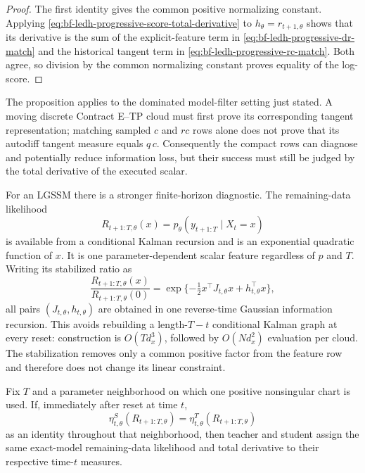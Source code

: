 \begin{proof}
The first identity gives the common positive normalizing constant.  Applying
\eqref{eq:bf-ledh-progressive-score-total-derivative} to
\(h_\theta=r_{t+1,\theta}\) shows that its derivative is the sum of the
explicit-feature term in \eqref{eq:bf-ledh-progressive-dr-match} and the
historical tangent term in \eqref{eq:bf-ledh-progressive-rc-match}.  Both agree,
so division by the common normalizing constant proves equality of the
log-score.
\end{proof}

The proposition applies to the dominated model-filter setting just stated.  A
moving discrete Contract E--TP cloud must first prove its corresponding tangent
representation; matching sampled \(c\) and \(rc\) rows alone does not prove that
its autodiff tangent measure equals \(q\,c\).  Consequently the compact rows can
diagnose and potentially reduce information loss, but their success must still
be judged by the total derivative of the executed scalar.

For an LGSSM there is a stronger finite-horizon diagnostic.  The remaining-data
likelihood
\begin{equation}
\label{eq:bf-ledh-lgssm-continuation-feature}
  R_{t+1:T,\theta}(x)
  =p_\theta(y_{t+1:T}\mid X_t=x)
\end{equation}
is available from a conditional Kalman recursion and is an exponential
quadratic function of \(x\).  It is one parameter-dependent scalar feature
regardless of \(p\) and \(T\).
Writing its stabilized ratio as
\[
 \frac{R_{t+1:T,\theta}(x)}{R_{t+1:T,\theta}(0)}
 =\exp\{-\tfrac12x^\top J_{t,\theta}x+h_{t,\theta}^\top x\},
\]
all pairs \((J_{t,\theta},h_{t,\theta})\) are obtained in one reverse-time
Gaussian information recursion.  This avoids rebuilding a length-\(T-t\)
conditional Kalman graph at every reset: construction is \(O(Td_x^3)\), followed
by \(O(Nd_x^2)\) evaluation per cloud.  The stabilization removes only a common
positive factor from the feature row and therefore does not change its linear
constraint.

\begin{proposition}
\label{prop:bf-ledh-lgssm-continuation-certificate}
Fix \(T\) and a parameter neighborhood on which one positive nonsingular chart
is used.  If, immediately after reset at time \(t\),
\begin{equation}
  \eta^S_{t,\theta}(R_{t+1:T,\theta})
  =\eta^T_{t,\theta}(R_{t+1:T,\theta})
\end{equation}
as an identity throughout that neighborhood, then teacher and student assign
the same exact-model remaining-data likelihood and total derivative to their
respective time-\(t\) measures.
\end{proposition}

